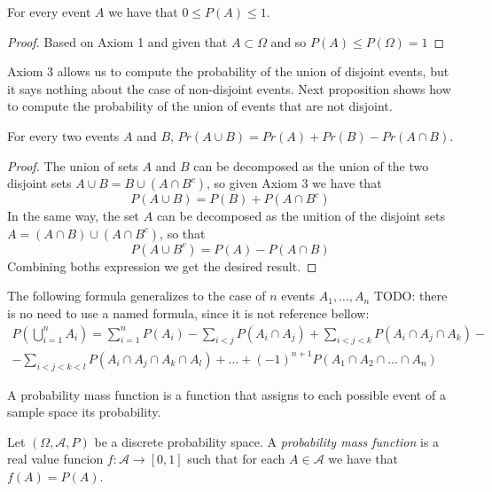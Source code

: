 \begin{proposition}
For every event $A$ we have that $0 \leq P \left( A \right) \leq 1$.
\end{proposition}
\begin{proof}
Based on Axiom 1 and given that $A \subset \Omega$ and so $P \left( A \right) \leq P \left( \Omega \right) = 1$
\end{proof}

Axiom 3 allows us to compute the probability of the union of disjoint events, but it says nothing about the case of non-disjoint events. Next proposition shows how to compute the probability of the union of events that are not disjoint.

\begin{proposition}
For every two events $A$ and $B$, $Pr\left(A\cup B\right)=Pr\left(A\right)+Pr\left(B\right)-Pr\left(A\cap B\right)$.
\end{proposition}
\begin{proof}
The union of sets $A$ and $B$ can be decomposed as the union of the two disjoint sets $A \cup B = B \cup \left( A \cap B^c \right)$, so given Axiom 3 we have that
\[
P \left( A \cup B \right) = P \left( B \right) + P \left( A \cap B^c \right)
\]
In the same way, the set $A$ can be decomposed as the unition of the disjoint sets $A = \left( A \cap B \right) \cup \left( A \cap B^c \right)$, so that
\[
P \left( A \cup B^c \right) = P \left( A \right) - P \left( A \cap B \right)
\]
Combining boths expression we get the desired result.
\end{proof}

The following formula generalizes to the case of $n$ events $A_1, \ldots, A_n$ {\color{red} TODO: there is no need to use a named formula, since it is not reference bellow}:
\begin{multline}
P \left( \bigcup_{i=1}^n A_i \right) = \sum_{i=1}^n P \left( A_i \right) - \sum_{i<j} P \left( A_i \cap A_j \right) + \sum_{i<j<k} P \left( A_i \cap A_j \cap A_k \right) - \\
 - \sum_{i<j<k<l} P \left( A_i \cap A_j \cap A_k \cap A_l \right) + \ldots +  (-1)^{n+1} P \left( A_1 \cap A_2 \cap \ldots \cap A_n \right) 
\end{multline}

A probability mass function is a function that assigns to each possible event of a sample space its probability.

\begin{definition}
\label{def:probability_function}
Let $\left( \Omega, \mathcal{A} , P \right)$ be a discrete probability space. A \emph{probability mass function} is a real value funcion $f : \mathcal{A} \rightarrow [0, 1]$ such that for each $A \in \mathcal{A}$ we have that $f \left( A \right) = P \left( A \right)$.
\end{definition}

